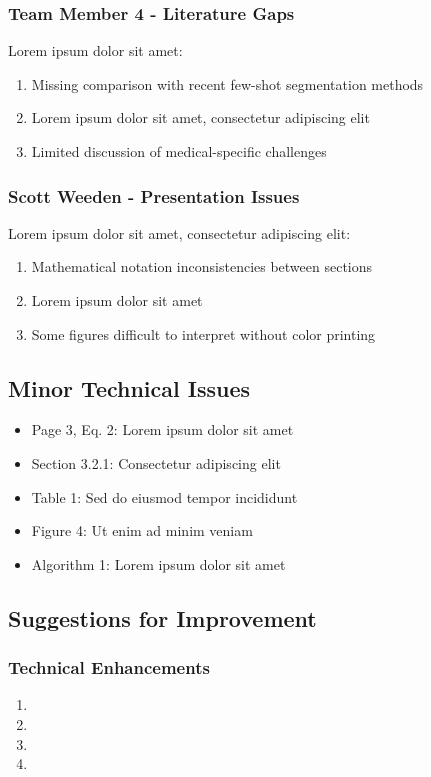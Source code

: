 \subsubsection{Team Member 4 - Literature Gaps}
Lorem ipsum dolor sit amet:
\begin{enumerate}
    \item Missing comparison with recent few-shot segmentation methods
    \item Lorem ipsum dolor sit amet, consectetur adipiscing elit
    \item Limited discussion of medical-specific challenges
\end{enumerate}

\subsubsection{Scott Weeden - Presentation Issues}
Lorem ipsum dolor sit amet, consectetur adipiscing elit:
\begin{enumerate}
    \item Mathematical notation inconsistencies between sections
    \item Lorem ipsum dolor sit amet
    \item Some figures difficult to interpret without color printing
\end{enumerate}

\subsection{Minor Technical Issues}
\begin{itemize}
    \item Page 3, Eq. 2: Lorem ipsum dolor sit amet
    \item Section 3.2.1: Consectetur adipiscing elit
    \item Table 1: Sed do eiusmod tempor incididunt
    \item Figure 4: Ut enim ad minim veniam
    \item Algorithm 1: Lorem ipsum dolor sit amet
\end{itemize}

\subsection{Suggestions for Improvement}
\subsubsection{Technical Enhancements}
\begin{enumerate}
    \item {}
    \item {}
    \item {}
    \item {}
\end{enumerate}

